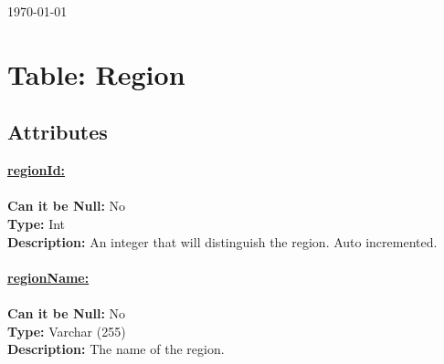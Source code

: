 \begin{titlepage}


{\large \today}\\[3cm] %


 

\vfill %

\end{titlepage}
\tableofcontents


\newpage
\section{Table: Region}
\subsection{Attributes}
\textbf{\underline{regionId:}}\\\\
\textbf{Can it be Null:} No\\
\textbf{Type:} Int\\
\textbf{Description:} An integer that will distinguish the region. Auto incremented.\\\\


\textbf{\underline{regionName:}}\\\\
\textbf{Can it be Null:} No\\
\textbf{Type:} Varchar (255)\\
\textbf{Description:} The name of the region.


